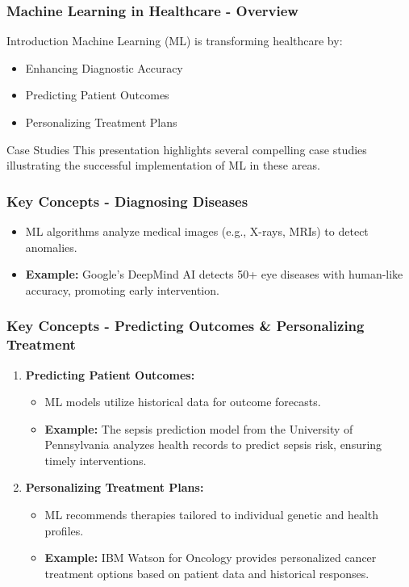 \documentclass[aspectratio=169]{beamer}
\begin{document}
\begin{frame}[fragile]
    \frametitle{Machine Learning in Healthcare - Overview}
    \begin{block}{Introduction}
        Machine Learning (ML) is transforming healthcare by:
        \begin{itemize}
            \item Enhancing Diagnostic Accuracy
            \item Predicting Patient Outcomes
            \item Personalizing Treatment Plans
        \end{itemize}
    \end{block}
    \begin{block}{Case Studies}
        This presentation highlights several compelling case studies illustrating the successful implementation of ML in these areas.
    \end{block}
\end{frame}

\begin{frame}[fragile]
    \frametitle{Key Concepts - Diagnosing Diseases}
    \begin{itemize}
        \item ML algorithms analyze medical images (e.g., X-rays, MRIs) to detect anomalies.
        \item \textbf{Example:} Google's DeepMind AI detects 50+ eye diseases with human-like accuracy, promoting early intervention.
    \end{itemize}
\end{frame}

\begin{frame}[fragile]
    \frametitle{Key Concepts - Predicting Outcomes & Personalizing Treatment}
    \begin{enumerate}
        \item \textbf{Predicting Patient Outcomes:}
            \begin{itemize}
                \item ML models utilize historical data for outcome forecasts.
                \item \textbf{Example:} The sepsis prediction model from the University of Pennsylvania analyzes health records to predict sepsis risk, ensuring timely interventions.
            \end{itemize}
        \item \textbf{Personalizing Treatment Plans:}
            \begin{itemize}
                \item ML recommends therapies tailored to individual genetic and health profiles.
                \item \textbf{Example:} IBM Watson for Oncology provides personalized cancer treatment options based on patient data and historical responses.
            \end{itemize}
    \end{enumerate}
\end{frame}
\end{document}
